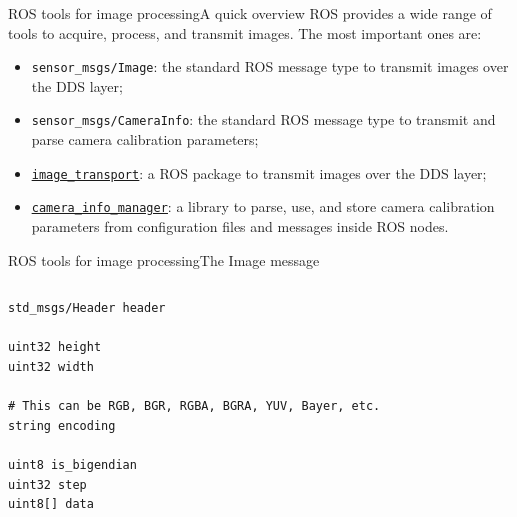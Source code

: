 \begin{frame}{ROS tools for image processing}{A quick overview}
	ROS provides a wide range of tools to acquire, process, and transmit images. The most important ones are:
	\begin{itemize}
		\item \texttt{sensor\_msgs/Image}: the standard ROS message type to transmit images over the DDS layer;
		\item \texttt{sensor\_msgs/CameraInfo}: the standard ROS message type to transmit and parse camera calibration parameters;
		\item \href{https://wiki.ros.org/image_transport}{\color{blue}\underline{\texttt{image\_transport}}}: a ROS package to transmit images over the DDS layer;
		\item \href{https://wiki.ros.org/camera_info_manager}{\color{blue}\underline{\texttt{camera\_info\_manager}}}: a library to parse, use, and store camera calibration parameters from configuration files and messages inside ROS nodes.
	\end{itemize}
\end{frame}
\begin{frame}[fragile]{ROS tools for image processing}{The Image message}
	\begin{columns}
		\begin{lstlisting}[language=ros2msg, caption=Definition of the \texttt{sensor\_msgs/msg/Image} message.]
std_msgs/Header header

uint32 height
uint32 width

# This can be RGB, BGR, RGBA, BGRA, YUV, Bayer, etc.
string encoding

uint8 is_bigendian
uint32 step
uint8[] data\end{lstlisting}
	\end{columns}
\end{frame}
